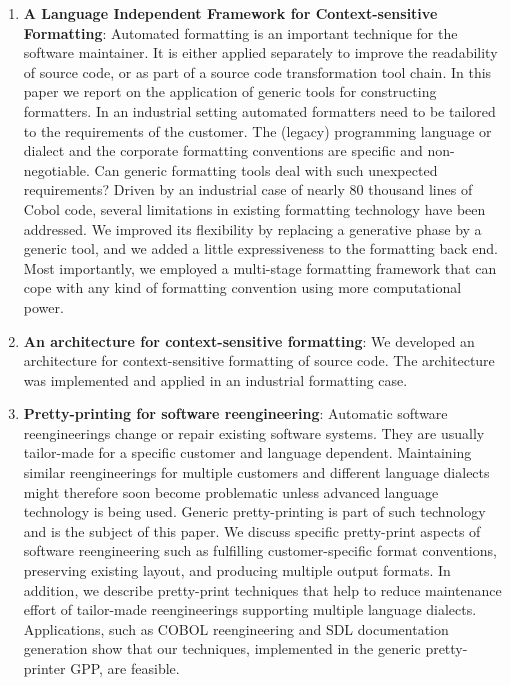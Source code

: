\begin{englishtext}
\begin{enumerate}
    \item \textbf{A Language Independent Framework for Context-sensitive Formatting}:
    Automated formatting is an important technique for the software maintainer.
    It is either applied separately to improve the readability of source code,
    or as part of a source code transformation tool chain. In this paper we
    report on the application of generic tools for constructing formatters. In
    an industrial setting automated formatters need to be tailored to the
    requirements of the customer. The (legacy) programming language or dialect
    and the corporate formatting conventions are specific and non-negotiable.
    Can generic formatting tools deal with such unexpected requirements? Driven
    by an industrial case of nearly 80 thousand lines of Cobol code, several
    limitations in existing formatting technology have been addressed. We
    improved its flexibility by replacing a generative phase by a generic tool,
    and we added a little expressiveness to the formatting back end. Most
    importantly, we employed a multi-stage formatting framework that can cope
    with any kind of formatting convention using more computational power.
    \cite{independentFramework}

    \item \textbf{An architecture for context-sensitive formatting}: We developed an
    architecture for context-sensitive formatting of source code. The
    architecture was implemented and applied in an industrial formatting case.
    \cite{architectureFormatting}

    \item \textbf{Pretty-printing for software reengineering}: Automatic software
    reengineerings change or repair existing software systems. They are usually
    tailor-made for a specific customer and language dependent. Maintaining
    similar reengineerings for multiple customers and different language
    dialects might therefore soon become problematic unless advanced language
    technology is being used. Generic pretty-printing is part of such technology
    and is the subject of this paper. We discuss specific pretty-print aspects
    of software reengineering such as fulfilling customer-specific format
    conventions, preserving existing layout, and producing multiple output
    formats. In addition, we describe pretty-print techniques that help to
    reduce maintenance effort of tailor-made reengineerings supporting multiple
    language dialects. Applications, such as COBOL reengineering and SDL
    documentation generation show that our techniques, implemented in the
    generic pretty-printer GPP, are feasible. \cite{prettyPrinting}


\end{enumerate}
\end{englishtext}
